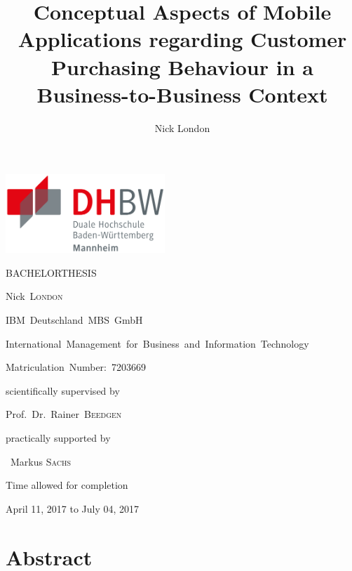 \documentclass[12pt,a4paper,oneside,openright,onecolumn,titlepage]{scrbook}
\author{Nick London}
\title{Conceptual Aspects of Mobile Applications regarding Customer Purchasing Behaviour in a Business-to-Business Context}
\begin{document}
\begin{titlepage}
	\includegraphics[height=8em]{img/logos/dhbw.pdf}
	\hfill
	\par
	\centering
	\vfill
	{\huge \textsc{\MakeUppercase{Bachelorthesis}}\par}
	\vspace{2em}
	{\Huge \textbf{\thetitle}\par}
	\vspace{1.5em}
	{\large Nick~\textsc{London}\par}
	\vfill
	{\small IBM~Deutschland~MBS~GmbH\par
	International~Management~for~Business~and~Information~Technology \par
	Matriculation~Number:~7203669}
	\vfill
	{scientifically supervised by\par Prof.~Dr.~Rainer~\textsc{Beedgen}\par}
	\par\vspace{1em}
	{practically supported by\par ~Markus \textsc{Sachs}\par}
	\vspace{2em}
	{Time allowed for completion\par April 11, 2017 to July 04, 2017\par}
\end{titlepage}

\setcounter{page}{1}

\chapter*{Abstract}


\tableofcontents

\newpage
{}
\listoffigures
\end{document}
